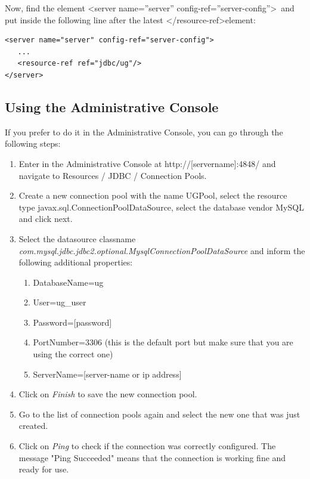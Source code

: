 \documentclass[envcountsame,envcountchap]{svmono}
\begin{document}
Now, find the element \textless server name=''server'' config-ref=''server-config''\textgreater \ and put inside the following line after the latest \textless /resource-ref\textgreater element:

\begin{verbatim}
<server name="server" config-ref="server-config">
   ...
   <resource-ref ref="jdbc/ug"/>
</server>
\end{verbatim}

\subsection{Using the Administrative Console}

If you prefer to do it in the Administrative Console, you can go through the following steps:

\begin{enumerate}
\item  Enter in the Administrative Console at http://[servername]:4848/ and navigate to Resources / JDBC / Connection Pools.
\item Create a new connection pool with the name UGPool, select the resource type javax.sql.ConnectionPoolDataSource, select the database vendor MySQL and click next.
\item Select the datasource classname \\ \textit{com.mysql.jdbc.jdbc2.optional.MysqlConnectionPoolDataSource} and inform the following additional properties:
   \begin{enumerate}
   \item DatabaseName=ug
   \item User=ug\_user
   \item Password=[password]
   \item PortNumber=3306 (this is the default port but make sure
   that you are using the correct one)
   \item ServerName=[server-name or ip address]
   \end{enumerate}
\item Click on \textit{Finish} to save the new connection pool.
\item Go to the list of connection pools again and select the new one that was just created.
\item Click on \textit{Ping} to check if the connection was correctly configured. The message "Ping Succeeded" means that the connection is working fine and ready for use.
\end{enumerate}
\end{document}
